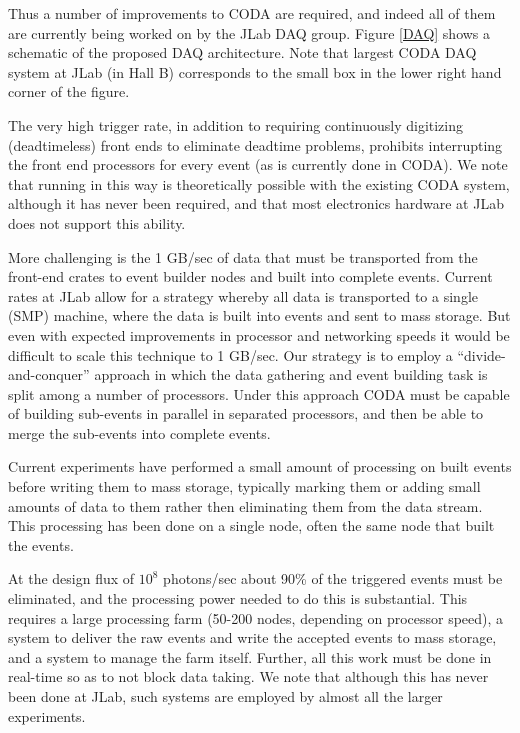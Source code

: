 \documentclass[11pt]{article}
\begin{document}
Thus a number of improvements to CODA are required, and indeed all of
them are currently being worked on by the JLab DAQ group.  Figure \ref{DAQ}
shows a schematic of the proposed DAQ architecture.  Note that largest
CODA DAQ system at JLab (in Hall B) corresponds to the small box in
the lower right hand corner of the figure.



The very high trigger rate, in addition to requiring continuously
digitizing (deadtimeless) front ends to eliminate deadtime problems,
prohibits interrupting the front end processors for every event (as is
currently done in CODA).  We note that running in this way is
theoretically possible with the existing CODA system, although it has
never been required, and that most electronics hardware at JLab does
not support this ability.



More challenging is the 1 GB/sec of data that must be transported from
the front-end crates to event builder nodes and built into complete
events.  Current rates at JLab allow for a strategy whereby all data
is transported to a single (SMP) machine, where the data is built into
events and sent to mass storage.  But even with expected improvements
in processor and networking speeds it would be difficult to scale this
technique to 1 GB/sec. Our strategy is to employ a
``divide-and-conquer'' approach in which the data gathering and event
building task is split among a number of processors.  Under this
approach CODA must be capable of building sub-events in parallel in
separated processors, and then be able to merge the sub-events into
complete events.



Current experiments have performed a small amount of processing on
built events before writing them to mass storage, typically marking
them or adding small amounts of data to them rather then eliminating
them from the data stream.  This processing has been done on a single
node, often the same node that built the events.



At the design flux of $10^8$ photons/sec about 90\% of the triggered
events must be eliminated, and the processing power needed to do this
is substantial.  This requires a large processing farm (50-200 nodes,
depending on processor speed), a system to deliver the raw events and
write the accepted events to mass storage, and a system to manage the
farm itself.  Further, all this work must be done in real-time so as
to not block data taking.  We note that although this has never been
done at JLab, such systems are employed by almost all the larger
experiments.
\end{document}
